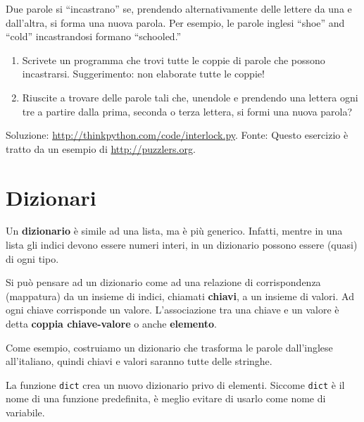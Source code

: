 \documentclass[10pt]{book}
\begin{document}
\vspace{0.2in}
\begin{exercise}

Due parole si ``incastrano'' se, prendendo alternativamente delle lettere da una e dall'altra, si forma una nuova parola. Per esempio, le parole inglesi ``shoe'' and ``cold'' incastrandosi formano ``schooled.''


\begin{enumerate}

\item Scrivete un programma che trovi tutte le coppie di parole che possono incastrarsi. Suggerimento: non elaborate tutte le coppie!

\item Riuscite a trovare delle parole tali che, unendole e prendendo una lettera ogni tre a partire dalla prima, seconda o terza lettera, si formi una nuova parola?

\end{enumerate}

Soluzione: \url{http://thinkpython.com/code/interlock.py}.
Fonte: Questo esercizio è tratto da un esempio di  \url{http://puzzlers.org}.
\end{exercise}


\chapter{Dizionari}

Un {\bf dizionario} è simile ad una lista, ma è più generico. Infatti, mentre in una lista gli indici devono essere numeri interi, in un dizionario possono essere (quasi) di ogni tipo.

Si può pensare ad un dizionario come ad una relazione di corrispondenza (mappatura) da un insieme di indici, chiamati {\bf chiavi}, a un insieme di valori. Ad ogni chiave corrisponde un valore. L'associazione tra una chiave e un valore è detta {\bf coppia chiave-valore} o anche {\bf elemento}.

Come esempio, costruiamo un dizionario che trasforma le parole dall'inglese all'italiano, quindi chiavi e valori saranno tutte delle stringhe.

La funzione {\tt dict} crea un nuovo dizionario privo di elementi. Siccome {\tt dict} è il nome di una funzione predefinita, è meglio evitare di usarlo come nome di variabile.
\end{document}
